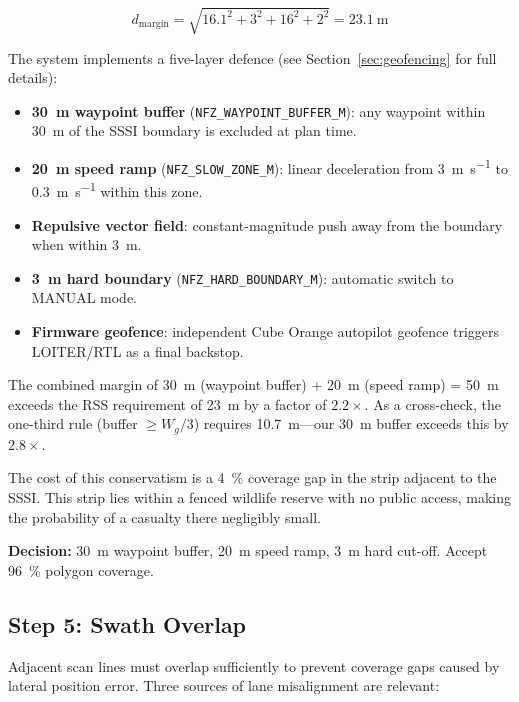 \begin{equation}
  d_{\mathrm{margin}} = \sqrt{16.1^2 + 3^2 + 16^2 + 2^2} = \SI{23.1}{\metre}
\end{equation}

The system implements a five-layer defence (see Section~\ref{sec:geofencing} for full details):

\begin{itemize}
  \item \textbf{\SI{30}{\metre} waypoint buffer} (\texttt{NFZ\_WAYPOINT\_BUFFER\_M}): any waypoint within \SI{30}{\metre} of the SSSI boundary is excluded at plan time.
  \item \textbf{\SI{20}{\metre} speed ramp} (\texttt{NFZ\_SLOW\_ZONE\_M}): linear deceleration from \SI{3}{\metre\per\second} to \SI{0.3}{\metre\per\second} within this zone.
  \item \textbf{Repulsive vector field}: constant-magnitude push away from the boundary when within \SI{3}{\metre}.
  \item \textbf{\SI{3}{\metre} hard boundary} (\texttt{NFZ\_HARD\_BOUNDARY\_M}): automatic switch to MANUAL mode.
  \item \textbf{Firmware geofence}: independent Cube Orange autopilot geofence triggers LOITER/RTL as a final backstop.
\end{itemize}

The combined margin of \SI{30}{\metre} (waypoint buffer) + \SI{20}{\metre} (speed ramp) = \SI{50}{\metre} exceeds the RSS requirement of \SI{23}{\metre} by a factor of $2.2\times$.
As a cross-check, the one-third rule (buffer $\geq W_g / 3$) requires \SI{10.7}{\metre}---our \SI{30}{\metre} buffer exceeds this by $2.8\times$.

The cost of this conservatism is a \SI{4}{\percent} coverage gap in the strip adjacent to the SSSI.
This strip lies within a fenced wildlife reserve with no public access, making the probability of a casualty there negligibly small.

\textbf{Decision:} \SI{30}{\metre} waypoint buffer, \SI{20}{\metre} speed ramp, \SI{3}{\metre} hard cut-off.
Accept \SI{96}{\percent} polygon coverage.

\subsection{Step 5: Swath Overlap}\label{sec:step-overlap}

Adjacent scan lines must overlap sufficiently to prevent coverage gaps caused by lateral position error.
Three sources of lane misalignment are relevant:

